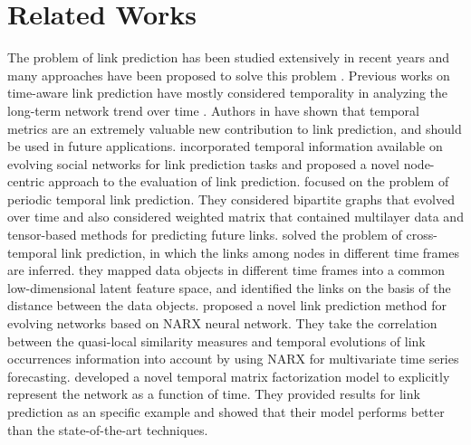 \section{Related Works}\label{sec:related}

The problem of link prediction has been studied extensively in recent years and many approaches have been proposed to solve this problem \cite{wang2015link,wang2014review}.
Previous works on time-aware link prediction have mostly considered temporality in analyzing the long-term network trend over time \cite{dhote2013survey}. Authors in \cite{potgieter2009temporality} have shown that temporal metrics are an extremely valuable new contribution to link prediction, and should be used in future applications. \cite{tylenda2009towards} incorporated temporal information available on evolving social networks for link prediction tasks and proposed a novel node-centric approach to the evaluation of link prediction. \cite{dunlavy2011temporal} focused on the problem of periodic temporal link prediction. They considered bipartite graphs that evolved over time and also considered weighted matrix that contained multilayer data and tensor-based methods for predicting future links. \cite{oyama2011cross} solved the problem of cross-temporal link prediction, in which the links among nodes in different time frames are inferred. they mapped data objects in different time frames into a common low-dimensional latent feature space, and identified the links on the basis of the distance between the data objects. \cite{ozcan2016temporal} proposed a novel link prediction method for evolving networks based on NARX neural network. They take the correlation between the quasi-local similarity measures and temporal evolutions of link occurrences information into account by using NARX for multivariate time series forecasting. \cite{yu2017temporally} developed a novel temporal matrix factorization model to explicitly represent the network as a function of time. They provided results for link prediction as an specific example and showed that their model performs better than the state-of-the-art techniques.

